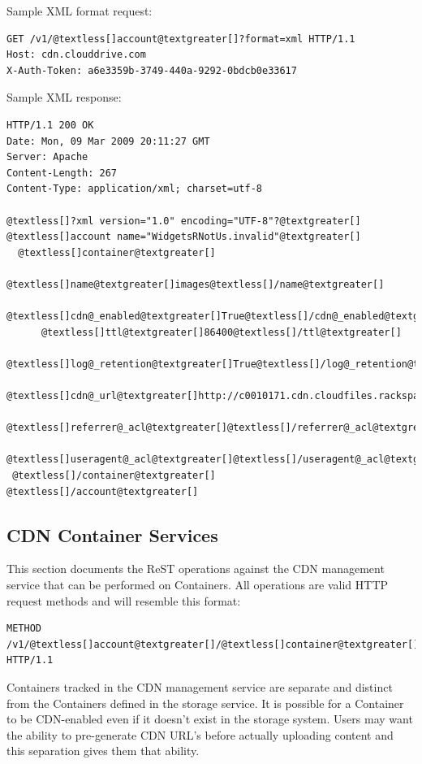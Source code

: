 \documentclass[letterpaper,10pt,english]{manual}
\begin{document}
Sample XML format request:

\begin{Verbatim}[commandchars=@\[\]]
GET /v1/@textless[]account@textgreater[]?format=xml HTTP/1.1
Host: cdn.clouddrive.com
X-Auth-Token: a6e3359b-3749-440a-9292-0bdcb0e33617
\end{Verbatim}

Sample XML response:

\begin{Verbatim}[commandchars=@\[\]]
HTTP/1.1 200 OK
Date: Mon, 09 Mar 2009 20:11:27 GMT
Server: Apache
Content-Length: 267
Content-Type: application/xml; charset=utf-8

@textless[]?xml version="1.0" encoding="UTF-8"?@textgreater[]
@textless[]account name="WidgetsRNotUs.invalid"@textgreater[]
  @textless[]container@textgreater[]
      @textless[]name@textgreater[]images@textless[]/name@textgreater[]
      @textless[]cdn@_enabled@textgreater[]True@textless[]/cdn@_enabled@textgreater[]
      @textless[]ttl@textgreater[]86400@textless[]/ttl@textgreater[]
      @textless[]log@_retention@textgreater[]True@textless[]/log@_retention@textgreater[]
      @textless[]cdn@_url@textgreater[]http://c0010171.cdn.cloudfiles.rackspacecloud.com/@textless[]/cdn@_url@textgreater[]
      @textless[]referrer@_acl@textgreater[]@textless[]/referrer@_acl@textgreater[]
      @textless[]useragent@_acl@textgreater[]@textless[]/useragent@_acl@textgreater[]
 @textless[]/container@textgreater[]
@textless[]/account@textgreater[]
\end{Verbatim}


\subsection{CDN Container Services}

This section documents the ReST operations against the CDN management
service that can be performed on Containers. All operations are valid
HTTP request methods and will resemble this format:

\begin{Verbatim}[commandchars=@\[\]]
METHOD /v1/@textless[]account@textgreater[]/@textless[]container@textgreater[] HTTP/1.1
\end{Verbatim}

Containers tracked in the CDN management service are separate
and distinct from the Containers defined in the storage service.  It
is possible for a Container to be CDN-enabled even if it doesn't exist
in the storage system.  Users may want the ability to pre-generate
CDN URL's before actually uploading content and this separation gives
them that ability.
\end{document}
